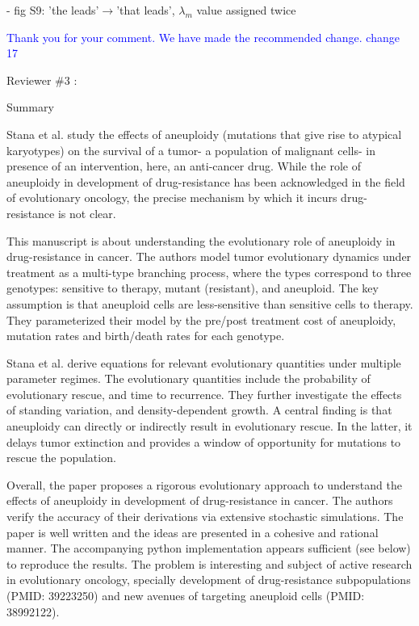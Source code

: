 \documentclass[11pt,a4paper]{article}
\begin{document}
- fig S9: 'the leads'$\rightarrow$'that leads', $\lambda_m$ value assigned twice

\textcolor{blue}{Thank you for your comment. We have made the recommended change. change 17} 

Reviewer $\#3$ :

Summary

Stana et al. study the effects of aneuploidy (mutations that give rise to atypical karyotypes) on the survival of a tumor- a population of malignant cells- in presence of an intervention, here, an anti-cancer drug. While the role of aneuploidy in development of drug-resistance has been acknowledged in the field of evolutionary oncology, the precise mechanism by which it incurs drug-resistance is not clear.

This manuscript is about understanding the evolutionary role of aneuploidy in drug-resistance in cancer. The authors model tumor evolutionary dynamics under treatment as a multi-type branching process, where the types correspond to three genotypes: sensitive to therapy, mutant (resistant), and aneuploid. The key assumption is that aneuploid cells are less-sensitive than sensitive cells to therapy. They parameterized their model by the pre/post treatment cost of aneuploidy, mutation rates and birth/death rates for each genotype.

Stana et al. derive equations for relevant evolutionary quantities under multiple parameter regimes. The evolutionary quantities include the probability of evolutionary rescue, and time to recurrence. They further investigate the effects of standing variation, and density-dependent growth. A central finding is that aneuploidy can directly or indirectly result in evolutionary rescue. In the latter, it delays tumor extinction and provides a window of opportunity for mutations to rescue the population.

Overall, the paper proposes a rigorous evolutionary approach to understand the effects of aneuploidy in development of drug-resistance in cancer. The authors verify the accuracy of their derivations via extensive stochastic simulations. The paper is well written and the ideas are presented in a cohesive and rational manner. The accompanying python implementation appears sufficient (see below) to reproduce the results. The problem is interesting and subject of active research in evolutionary oncology, specially development of drug-resistance subpopulations (PMID: 39223250) and new avenues of targeting aneuploid cells (PMID: 38992122).
\end{document}
